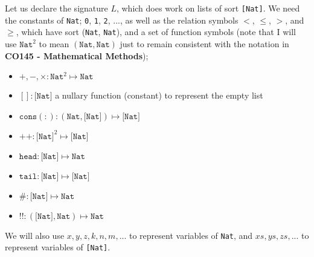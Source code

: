 \documentclass[a4paper, 12pt]{article}
\begin{document}
                Let us declare the signature $L$, which does work on lists of sort \texttt{[Nat]}. We need the constants of \texttt{Nat}; \texttt{0}, \texttt{1}, \texttt{2}, ..., as well as the relation symbols $<$, $\leq$, $>$, and $\geq$, which have sort (\texttt{Nat}, \texttt{Nat}), and a set of function symbols (note that I will use $\texttt{Nat}^2$ to mean $(\texttt{Nat}, \texttt{Nat})$ just to remain consistent with the notation in \textbf{CO145 - Mathematical Methods});
                \begin{itemize}
                    \itemsep0em
                    \item $+, -, \times : \texttt{Nat}^2 \mapsto \texttt{Nat}$
                    \item $[]: \texttt{[Nat]}$ \hfill a nullary function (constant) to represent the empty list
                    \item $\texttt{cons}(:): (\texttt{Nat}, \texttt{[Nat]}) \mapsto \texttt{[Nat]}$
                    \item $++: \texttt{[Nat]}^2 \mapsto \texttt{[Nat]}$
                    \item $\texttt{head}: \texttt{[Nat]} \mapsto \texttt{Nat}$
                    \item $\texttt{tail}: \texttt{[Nat]} \mapsto \texttt{[Nat]}$
                    \item $\#: \texttt{[Nat]} \mapsto \texttt{Nat}$
                    \item $!!: (\texttt{[Nat]}, \texttt{Nat}) \mapsto \texttt{Nat}$
                \end{itemize}
                We will also use $x, y, z, k, n, m, ...$ to represent variables of \texttt{Nat}, and $xs, ys, zs, ...$ to represent variables of \texttt{[Nat]}.
                \medskip
\end{document}
